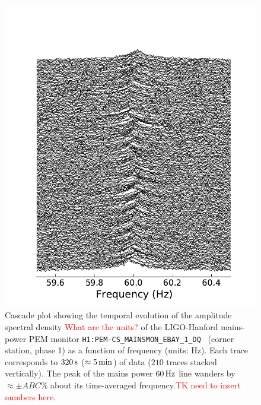 \documentclass[pra,superscriptaddress,reprint,amsmath,amssymb,nofootinbib]{revtex4-2}
\newcommand{\CSOneName}{\texttt{H1:PEM-CS\_MAINSMON\_EBAY\_1\_DQ}}
\begin{document}
\begin{figure}
	\includegraphics[width=\columnwidth]{images/powerCascade}
	\caption{Cascade plot showing the temporal evolution of the amplitude spectral density \textcolor{red}{What are the units?} of the LIGO-Hanford mains-power PEM monitor \CSOneName~ (corner station, phase 1) as a function of frequency (units: Hz). Each trace corresponds to $320\,{\rm s}$ ($\approx 5\,{\rm min}$) of data ($210$ traces stacked vertically). The peak of the mains power $60 \, {\rm Hz}$ line wanders by $\approx \pm ABC \%$ about its time-averaged frequency.\textcolor{red}{TK need  to insert numbers here}.
	}\label{fig:powerCascade}
\end{figure}




\end{document}
